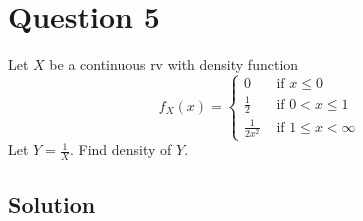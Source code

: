 \section*{Question 5}

Let \( X \) be a continuous rv with density function
\begin{equation*}
    f_{X}(x)= \begin{cases}0 & \text { if } x \leq 0 \\ \frac{1}{2} & \text { if } 0<x \leq 1 \\ \frac{1}{2 x^{2}} & \text { if } 1 \leq x<\infty\end{cases}
\end{equation*}
Let \( Y=\frac{1}{X} \). Find density of \( Y \).

\subsection*{Solution}
